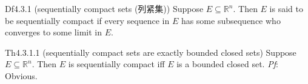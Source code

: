 \documentclass{article}
\begin{document}
\begin{Df}{Df4.3.1 (sequentially compact sets (列紧集))}
    Suppose $E\subseteq\mathbb{R}^n$. Then $E$ is said to be sequentially compact if every sequence in $E$ has some subsequence who converges to some limit in $E$.
\end{Df}

\begin{Th}{Th4.3.1.1 (sequentially compact sets are exactly bounded closed sets)}
    Suppose $E\subseteq\mathbb{R}^n$. Then $E$ is sequentially compact iff $E$ is a bounded closed set.
    \tcblower
    \textit{Pf}: Obvious.
\end{Th}
\end{document}
